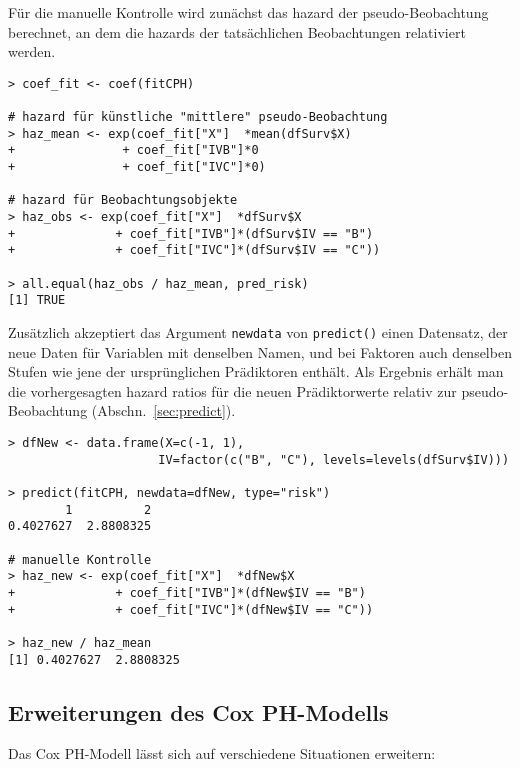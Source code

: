 Für die manuelle Kontrolle wird zunächst das hazard der pseudo-Beobachtung berechnet, an dem die hazards der tatsächlichen Beobachtungen relativiert werden.
\begin{lstlisting}
> coef_fit <- coef(fitCPH)

# hazard für künstliche "mittlere" pseudo-Beobachtung
> haz_mean <- exp(coef_fit["X"]  *mean(dfSurv$X)
+               + coef_fit["IVB"]*0
+               + coef_fit["IVC"]*0)

# hazard für Beobachtungsobjekte
> haz_obs <- exp(coef_fit["X"]  *dfSurv$X
+              + coef_fit["IVB"]*(dfSurv$IV == "B")
+              + coef_fit["IVC"]*(dfSurv$IV == "C"))

> all.equal(haz_obs / haz_mean, pred_risk)
[1] TRUE
\end{lstlisting}

Zusätzlich akzeptiert das Argument \lstinline!newdata! von \lstinline!predict()! einen Datensatz, der neue Daten für Variablen mit denselben Namen, und bei Faktoren auch denselben Stufen wie jene der ursprünglichen Prädiktoren enthält. Als Ergebnis erhält man die vorhergesagten hazard ratios für die neuen Prädiktorwerte relativ zur pseudo-Beobachtung (Abschn.\ \ref{sec:predict}).
\begin{lstlisting}
> dfNew <- data.frame(X=c(-1, 1),
                     IV=factor(c("B", "C"), levels=levels(dfSurv$IV)))
 
> predict(fitCPH, newdata=dfNew, type="risk")
        1          2 
0.4027627  2.8808325 

# manuelle Kontrolle
> haz_new <- exp(coef_fit["X"]  *dfNew$X
+              + coef_fit["IVB"]*(dfNew$IV == "B")
+              + coef_fit["IVC"]*(dfNew$IV == "C"))

> haz_new / haz_mean
[1] 0.4027627  2.8808325
\end{lstlisting}

\subsection{Erweiterungen des Cox PH-Modells}
\label{sec:coxExtend}

Das Cox PH-Modell lässt sich auf verschiedene Situationen erweitern:


